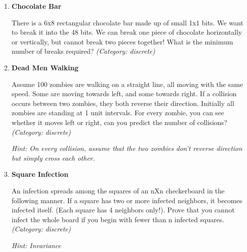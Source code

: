 \begin{enumerate}

\item \textbf{Chocolate Bar}

There is a 6x8 rectangular chocolate bar made up of small 1x1 bits. We want to break it into the 48 bits.  We can break one piece of chocolate horizontally or vertically, but cannot break two pieces together!  What is the minimum number of breaks required?
\small\emph{(Category: discrete)}




\item \textbf{Dead Men Walking}

Assume 100 zombies are walking on a straight line, all moving with the same speed. Some are moving towards left, and some towards right. If a collision occurs between two zombies, they both reverse their direction. Initially all zombies are standing at 1 unit intervals. For every zombie, you can see whether it moves left or right, can you predict the number of collisions?
\small\emph{(Category: discrete)}

\small\emph{Hint: On every collision, assume that the two zombies don't reverse direction but simply cross each other.}





\item \textbf{Square Infection}

An infection spreads among the squares of an nXn checkerboard in the following manner. If a square has two or more infected neighbors, it becomes infected itself. (Each square has 4 neighbors only!). Prove that you cannot infect the whole board if you begin with fewer than n infected squares.
\small\emph{(Category: discrete)}

\small\emph{Hint: Invariance}






\end{enumerate}
